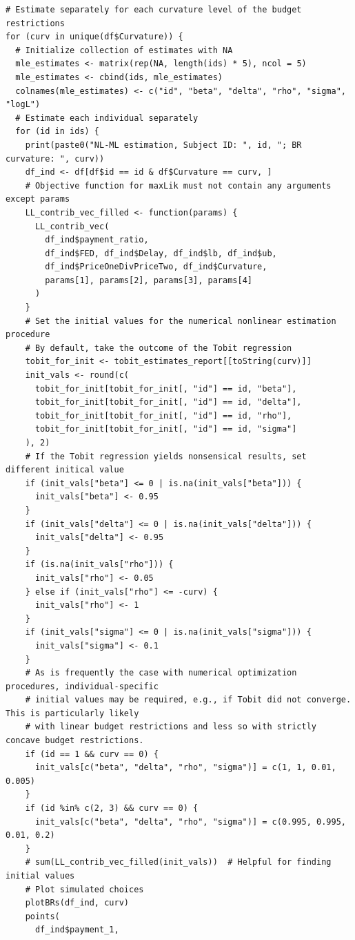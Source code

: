 \begin{lstlisting}
# Estimate separately for each curvature level of the budget restrictions
for (curv in unique(df$Curvature)) {
  # Initialize collection of estimates with NA
  mle_estimates <- matrix(rep(NA, length(ids) * 5), ncol = 5)
  mle_estimates <- cbind(ids, mle_estimates)
  colnames(mle_estimates) <- c("id", "beta", "delta", "rho", "sigma", "logL")
  # Estimate each individual separately
  for (id in ids) {
    print(paste0("NL-ML estimation, Subject ID: ", id, "; BR curvature: ", curv))
    df_ind <- df[df$id == id & df$Curvature == curv, ]
    # Objective function for maxLik must not contain any arguments except params
    LL_contrib_vec_filled <- function(params) {
      LL_contrib_vec(
        df_ind$payment_ratio,
        df_ind$FED, df_ind$Delay, df_ind$lb, df_ind$ub,
        df_ind$PriceOneDivPriceTwo, df_ind$Curvature,
        params[1], params[2], params[3], params[4]
      )
    }
    # Set the initial values for the numerical nonlinear estimation procedure
    # By default, take the outcome of the Tobit regression
    tobit_for_init <- tobit_estimates_report[[toString(curv)]]
    init_vals <- round(c(
      tobit_for_init[tobit_for_init[, "id"] == id, "beta"],
      tobit_for_init[tobit_for_init[, "id"] == id, "delta"],
      tobit_for_init[tobit_for_init[, "id"] == id, "rho"],
      tobit_for_init[tobit_for_init[, "id"] == id, "sigma"]
    ), 2)
    # If the Tobit regression yields nonsensical results, set different initical value
    if (init_vals["beta"] <= 0 | is.na(init_vals["beta"])) {
      init_vals["beta"] <- 0.95
    }
    if (init_vals["delta"] <= 0 | is.na(init_vals["delta"])) {
      init_vals["delta"] <- 0.95
    }
    if (is.na(init_vals["rho"])) {
      init_vals["rho"] <- 0.05
    } else if (init_vals["rho"] <= -curv) {
      init_vals["rho"] <- 1
    }
    if (init_vals["sigma"] <= 0 | is.na(init_vals["sigma"])) {
      init_vals["sigma"] <- 0.1
    }
    # As is frequently the case with numerical optimization procedures, individual-specific
    # initial values may be required, e.g., if Tobit did not converge. This is particularly likely
    # with linear budget restrictions and less so with strictly concave budget restrictions.
    if (id == 1 && curv == 0) {
      init_vals[c("beta", "delta", "rho", "sigma")] = c(1, 1, 0.01, 0.005)
    }
    if (id %in% c(2, 3) && curv == 0) {
      init_vals[c("beta", "delta", "rho", "sigma")] = c(0.995, 0.995, 0.01, 0.2)
    }
    # sum(LL_contrib_vec_filled(init_vals))  # Helpful for finding initial values
    # Plot simulated choices
    plotBRs(df_ind, curv)
    points(
      df_ind$payment_1,

\end{lstlisting}
